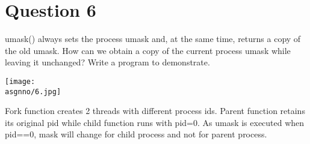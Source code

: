 \documentclass[main.tex]{subfiles}
\begin{document}
\section{Question 6}

umask() always sets the process umask and, at the same time, returns a copy of
the old umask. How can we obtain a copy of the current process umask while
leaving it unchanged? Write a program to demonstrate.


\centering\texttt{[image: \\asgnno/6.jpg]}

Fork function creates 2 threads with different process ids. Parent function
retains its original pid while child function runs with pid=0. As umask is
executed when pid==0, mask will change for child process and not for parent
process.
\end{document}
